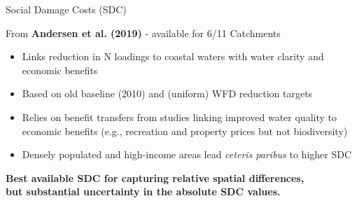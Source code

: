 \documentclass[t,24pt,aspectratio=169]{beamer}
\begin{document}
\begin{frame}{\vspace{-3ex} Social Damage Costs (SDC)}


From \textbf{Andersen et al. (2019)} - available for 6/11 Catchments
\begin{itemize}
    \vspace{1.5ex}
    \item Links reduction in N loadings to coastal waters with water clarity and economic benefits
    \vspace{1.5ex}
    \item Based on old baseline (2010) and (uniform) WFD reduction targets
    \vspace{1.5ex}
    \item Relies on benefit transfers from studies linking improved water quality to economic benefits (e.g., recreation and property prices but not biodiversity)
    \vspace{1.5ex}
    \item Densely populated and high-income areas lead \textit{ceteris paribus} to higher SDC 
\vspace{1ex}
    
\end{itemize}


\begin{alertblock}{}
\centering
\textbf{Best available SDC for capturing relative spatial differences,\\
but substantial uncertainty in the absolute SDC values.}
\end{alertblock}

\end{frame}
\end{document}
